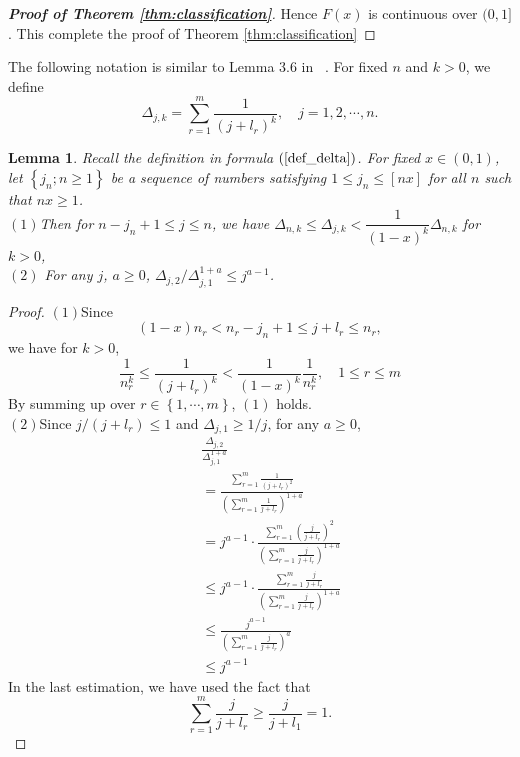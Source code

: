 \documentclass[12pt]{article}
\theoremstyle{plain}
\newtheorem{lem}{\textbf{Lemma}}
\theoremstyle{definition}
\theoremstyle{remark}
\begin{document}
\begin{proof}[\textit{\textbf{Proof of Theorem \ref{thm:classification}}}]
Hence $F(x)$ is continuous over $(0,1]$. This complete the proof of Theorem \ref{thm:classification}
\end{proof}

The following notation is similar to Lemma 3.6 in ~\cite{SRP}. For
fixed $n$ and $k>0$, we define
\begin{equation}\label{def_delta}
\Delta_{j, k}=\sum_{r=1}^{m} \frac{1}{\left(j+l_{r}\right)^{k}}, \quad j=1,2, \cdots, n.
\end{equation}

\begin{lem}
    Recall the definition in formula $(\ref{def_delta})$. For fixed $x\in (0,1)$, let $\left\{j_{n} ; n \geq 1\right\}$ be a sequence of numbers satisfying $1\leq j_n\leq [nx]$ for all $n$ such that $nx\geq 1$. \\
    $(1)$Then for $n-j_n +1\leq j \leq n$, we have $\Delta_{n, k} \leq \Delta_{j, k}<\dfrac{1}{(1-x)^{k}} \Delta_{n, k}$ for $k>0$,\\
    $(2)$ For any $j$, $a\geq 0$, $\Delta_{j, 2} / \Delta_{j, 1}^{1+a} \leq j^{a-1}$.
\end{lem}
\begin{proof}
    $(1)$Since
    \begin{equation*}
        (1-x)n_r< n_{r}-j_{n}+1 \leq j+l_{r} \leq n_{r},
    \end{equation*}
    we have for $k>0$,
    \begin{equation*}
        \frac{1}{n_{r}^{k}} \leq \frac{1}{\left(j+l_{r}\right)^{k}}<\frac{1}{(1-x)^k}\frac{1}{ n_{r}^{k}}, \quad 1 \leq r \leq m
    \end{equation*}
    By summing up over $r \in\left\{1, \cdots, m\right\}$, $(1)$ holds.\\
    $(2)$Since $j /\left(j+l_{r}\right) \leq 1$ and $\Delta_{j,1} \geq 1 / j$, for any $a\geq 0$,
    \begin{eqnarray*}
        &&\frac{\Delta_{j, 2}}{\Delta_{j, 1}^{1+a}}\\
        &&=\frac{\sum_{r=1}^{m} \frac{1}{\left(j+l_{r}\right)^{2}}}{\left(\sum_{r=1}^{m} \frac{1}{j+l_{r}}\right)^{1+a}}\\
        &&=j^{a-1} \cdot \frac{\sum_{r=1}^{m}\left(\frac{j}{j+l_{r}}\right)^{2}}{\left(\sum_{r=1}^{m} \frac{j}{j+l_{r}}\right)^{1+a}} \\
        &&\leq j^{a-1} \cdot \frac{\sum_{r=1}^{m} \frac{j}{j+l_{r}}}{\left(\sum_{r=1}^{m} \frac{j}{j+l_{r}}\right)^{1+a}} \\
        &&\leq \frac{j^{a-1}}{\left(\sum_{r=1}^{m} \frac{j}{j+l_{r}}\right)^{a}} \\
        &&\leq j^{a-1}
    \end{eqnarray*}
    In the last estimation, we have used the fact that
    \begin{equation*}
        \sum_{r=1}^{m} \frac{j}{j+l_{r}} \geq \frac{j}{j+l_{1}}=1.
    \end{equation*}
\end{proof}
\end{document}
